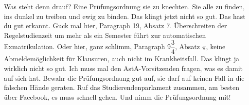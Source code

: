 \begin{verseplay}[4em]
\s{\Frodo} Was steht denn drauf?
\s{\Gandalf} 
					Eine Prüfungsordnung sie zu knechten.
					Sie alle zu finden,
					ins dunkel zu treiben
					und ewig zu binden.
\s{\Frodo} Das klingt jetzt nicht so gut.
\s{\Gandalf} Das hast du gut erkannt.
				Guck mal hier, Paragraph 19, Absatz 7. Überschreiten der Regelstudienzeit um mehr als ein Semester führt zur automatischen Exmatrikulation.
				Oder hier,  ganz schlimm, Paragraph 9$\dfrac{3}{4}$, Absatz $\pi$, keine Abmeldemöglichkeit für Klausuren, auch nicht im Krankheitsfall.
\s{\Frodo} Das klingt ja wirklich nicht so gut.
\s{\Gandalf} Ich muss mal den AstA-Vorsitzenden \Saruman fragen, was es damit auf sich hat. Bewahr die Prüfungsordnung gut auf, sie darf auf keinen Fall in die falschen Hände geraten. Ruf das Studierendenparlament zusammen, am besten über Facebook, es muss schnell gehen.  Und nimm die Prüfungsordnung mit!
			 
\end{verseplay}

